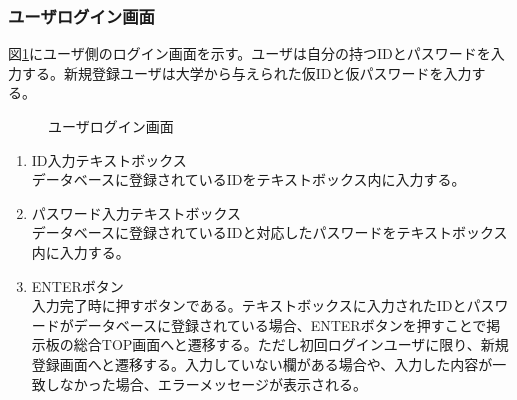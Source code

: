 \documentclass[a4j]{jarticle}
\begin{document}
\subsubsection{ユーザログイン画面}
図\ref{fig:login_user}にユーザ側のログイン画面を示す。ユーザは自分の持つIDとパスワードを入力する。新規登録ユーザは大学から与えられた仮IDと仮パスワードを入力する。
\begin{figure}[H]
\centering
{}
\caption{ユーザログイン画面}
\label{fig:login_user}
\end{figure}
\begin{enumerate}
  \renewcommand{\labelenumi}{\textcircled{\scriptsize \theenumi}}

\item ID入力テキストボックス\\
データベースに登録されているIDをテキストボックス内に入力する。
\item パスワード入力テキストボックス\\
データベースに登録されているIDと対応したパスワードをテキストボックス内に入力する。
\item ENTERボタン\\
入力完了時に押すボタンである。テキストボックスに入力されたIDとパスワードがデータベースに登録されている場合、ENTERボタンを押すことで掲示板の総合TOP画面へと遷移する。ただし初回ログインユーザに限り、新規登録画面へと遷移する。入力していない欄がある場合や、入力した内容が一致しなかった場合、エラーメッセージが表示される。
\end{enumerate}
\end{document}
